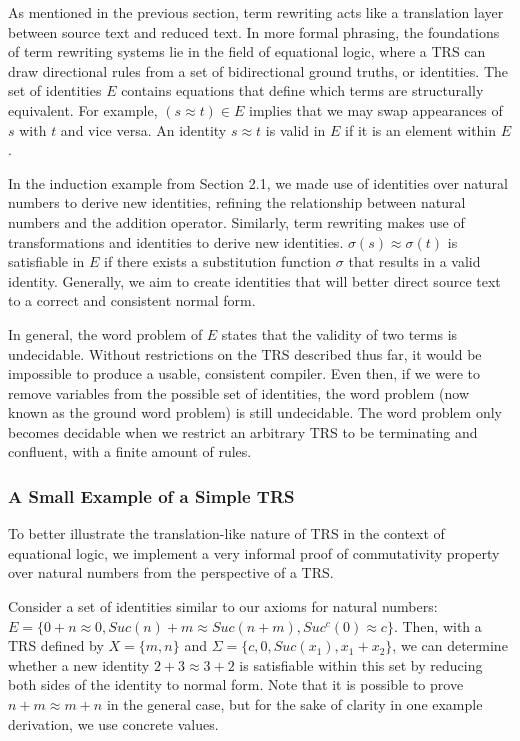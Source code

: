\documentclass{article}
\begin{document}
As mentioned in the previous section, term rewriting acts like a translation layer between source text and reduced text.
In more formal phrasing, the foundations of term rewriting systems lie in the field of equational logic,
where a TRS can draw directional rules from a set of bidirectional ground truths, or identities. The set of identities $E$
contains equations that define which terms are structurally equivalent. For example, $(s \approx t) \in E$ implies that
we may swap appearances of $s$ with $t$ and vice versa. An identity $s \approx t$ is valid in $E$ if it is an element within $E$.

In the induction example from Section 2.1,
we made use of identities over natural numbers to derive new identities, refining the relationship between natural numbers and the addition operator.
Similarly, term rewriting makes use of transformations and identities to derive new identities. $\sigma(s) \approx \sigma(t)$ is satisfiable in $E$ if
there exists a substitution function $\sigma$ that results in a valid identity. Generally, we aim to create identities that will better direct source text
to a correct and consistent normal form.

In general, the word problem of $E$ states that the validity of two terms is undecidable.
Without restrictions on the TRS described thus far,
it would be impossible to produce a usable, consistent compiler.
Even then, if we were to remove variables from the possible set of identities,
the word problem (now known as the ground word problem) is still undecidable.
The word problem only becomes decidable when we restrict an arbitrary TRS to be terminating and confluent, with a finite amount of rules.


\subsubsection{A Small Example of a Simple TRS}

To better illustrate the translation-like nature of TRS in the context of equational logic, we implement a very informal proof of commutativity property
over natural numbers from the perspective of a TRS.

Consider a set of identities similar to our axioms for natural numbers:
$E = \{0 + n \approx 0, Suc(n) + m \approx Suc(n + m), Suc^c(0) \approx c\}$.
Then, with a TRS defined by $X = \{m,n\}$ and $\Sigma = \{c,0, Suc(x_1), x_1 + x_2\}$,
we can determine whether a new identity $2 + 3 \approx 3 + 2$
is satisfiable within this set by reducing both sides of the identity to normal form.
Note that it is possible to prove $n + m \approx m + n$ in the general case, but for the sake of clarity in one example derivation,
we use concrete values.
\end{document}
